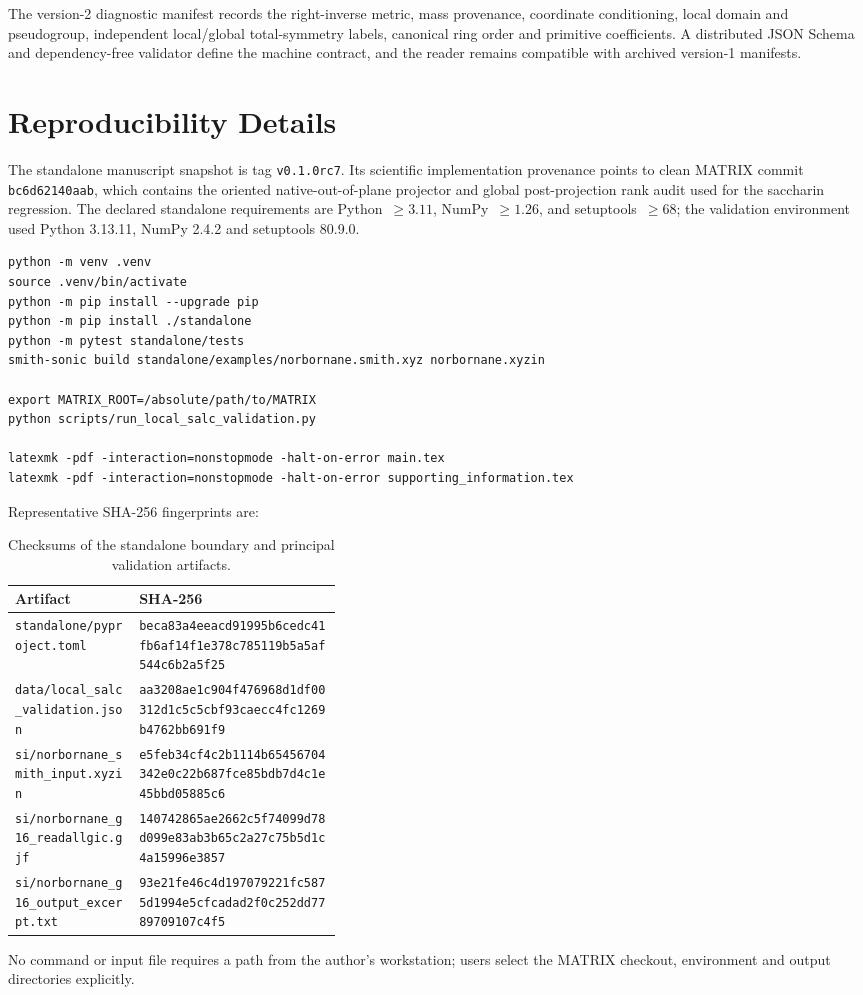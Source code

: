 \documentclass[10pt]{article}
\begin{document}
The version-2 diagnostic manifest records the right-inverse metric, mass
provenance, coordinate conditioning, local domain and pseudogroup, independent
local/global total-symmetry labels, canonical ring order and primitive
coefficients.  A distributed JSON Schema and dependency-free validator define
the machine contract, and the reader remains compatible with archived
version-1 manifests.

\section{Reproducibility Details}

The standalone manuscript snapshot is tag \texttt{v0.1.0rc7}.  Its scientific
implementation provenance points to clean MATRIX commit
\texttt{bc6d62140aab}, which contains the oriented native-out-of-plane
projector and global post-projection rank audit used for the saccharin
regression.  The declared standalone
requirements are Python~\(\geq3.11\), NumPy~\(\geq1.26\), and
setuptools~\(\geq68\); the validation environment used Python 3.13.11, NumPy
2.4.2 and setuptools 80.9.0.

\begin{lstlisting}
python -m venv .venv
source .venv/bin/activate
python -m pip install --upgrade pip
python -m pip install ./standalone
python -m pytest standalone/tests
smith-sonic build standalone/examples/norbornane.smith.xyz norbornane.xyzin

export MATRIX_ROOT=/absolute/path/to/MATRIX
python scripts/run_local_salc_validation.py

latexmk -pdf -interaction=nonstopmode -halt-on-error main.tex
latexmk -pdf -interaction=nonstopmode -halt-on-error supporting_information.tex
\end{lstlisting}

Representative SHA-256 fingerprints are:

\begin{table}[htbp]
\centering
\scriptsize
\caption{Checksums of the standalone boundary and principal validation artifacts.}
\begin{tabularx}{\linewidth}{@{}p{0.38\linewidth}X@{}}
\toprule
Artifact & SHA-256 \\
\midrule
\texttt{standalone/pyproject.toml} & \nolinkurl{beca83a4eeacd91995b6cedc41fb6af14f1e378c785119b5a5af544c6b2a5f25} \\
\texttt{data/local\_salc\_validation.json} & \nolinkurl{aa3208ae1c904f476968d1df00312d1c5c5cbf93caecc4fc1269b4762bb691f9} \\
\texttt{si/norbornane\_smith\_input.xyzin} & \nolinkurl{e5feb34cf4c2b1114b65456704342e0c22b687fce85bdb7d4c1e45bbd05885c6} \\
\texttt{si/norbornane\_g16\_readallgic.gjf} & \nolinkurl{140742865ae2662c5f74099d78d099e83ab3b65c2a27c75b5d1c4a15996e3857} \\
\texttt{si/norbornane\_g16\_output\_excerpt.txt} & \nolinkurl{93e21fe46c4d197079221fc5875d1994e5cfcadad2f0c252dd7789709107c4f5} \\
\bottomrule
\end{tabularx}
\end{table}

No command or input file requires a path from the author's workstation; users
select the MATRIX checkout, environment and output directories explicitly.
\end{document}
